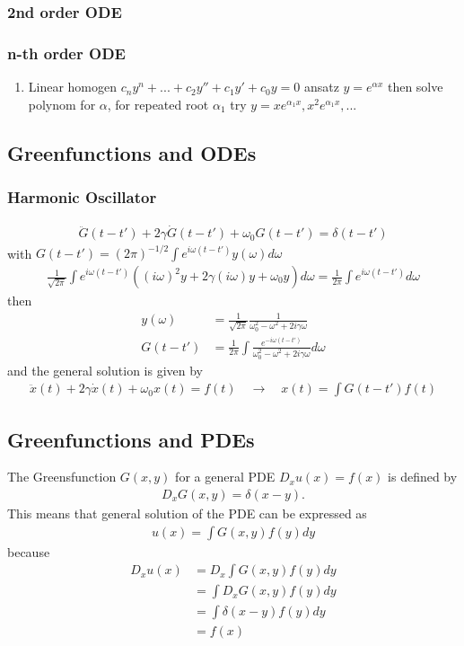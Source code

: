 \documentclass[10pt,a4paper]{article}
\theoremstyle{definition}
\begin{document}
\subsubsection{2nd order ODE}


\subsubsection{n-th order ODE}
\begin{enumerate}
\item Linear homogen $c_ny^{n}+...+c_{2}y''+c_{1}y'+c_{0}y=0$ ansatz $y=e^{\alpha x}$ then solve polynom for $\alpha$,  for repeated root $\alpha_1$ try $y=xe^{\alpha_1 x}, x^2e^{\alpha_1 x}, ...$
\end{enumerate}




\subsection{Greenfunctions and ODEs}
\subsubsection{Harmonic Oscillator}
\begin{align}
\ddot{G}(t-t')+2\gamma\dot{G}(t-t')+\omega_0G(t-t')=\delta(t-t')
\end{align}
with $G(t-t')=(2\pi)^{-1/2}\int e^{i\omega (t-t')}y(\omega)d\omega$
\begin{align}
\frac{1}{\sqrt{2\pi}}\int e^{i\omega (t-t')}\left((i\omega)^2y+2\gamma(i\omega)y+\omega_0y\right)d\omega=\frac{1}{2\pi}\int e^{i\omega(t-t')}d\omega
\end{align}
then
\begin{align}
y(\omega)&=\frac{1}{\sqrt{2\pi}}\frac{1}{\omega_0^2-\omega^2+2i\gamma\omega}\\
G(t-t')&=\frac{1}{2\pi}\int \frac{e^{-i\omega(t-t')}}{\omega_0^2-\omega^2+2i\gamma\omega}d\omega
\end{align}
and the general solution is given by
\begin{align}
\ddot{x}(t)+2\gamma\dot{x}(t)+\omega_0x(t)=f(t)\quad\rightarrow\quad
x(t)=\int G(t-t')f(t)
\end{align}

\subsection{Greenfunctions and PDEs}
The Greensfunction $G(x,y)$ for a general PDE $D_x u(x) = f(x)$ is defined by
\begin{align}
    D_x G(x,y) = \delta(x-y).
\end{align}
This means that general solution of the PDE can be expressed as
\begin{align}
    u(x)=\int G(x,y)f(y)dy
\end{align}
because
\begin{align}
    D_x u(x)
    &=D_x \int G(x,y)f(y)dy\\
    &=\int D_x G(x,y)f(y)dy\\
    &=\int \delta(x-y) f(y)dy\\
    &=f(x)
\end{align}
\end{document}
